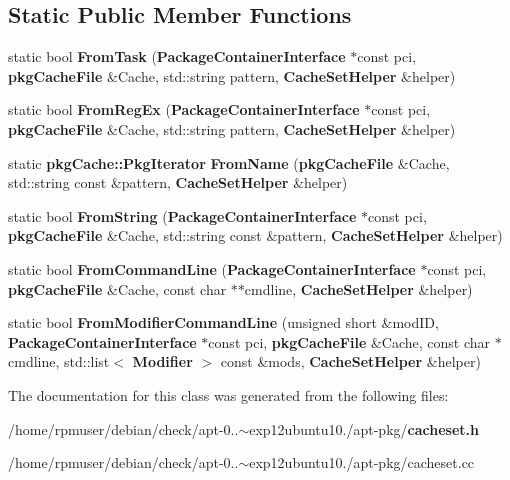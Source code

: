 \subsection*{\-Static \-Public \-Member \-Functions}
\begin{DoxyCompactItemize}
\item 
static bool {\bfseries \-From\-Task} ({\bf \-Package\-Container\-Interface} $\ast$const pci, {\bf pkg\-Cache\-File} \&\-Cache, std\-::string pattern, {\bf \-Cache\-Set\-Helper} \&helper)\label{classAPT_1_1PackageContainerInterface_a16cb5b96236de4a8ab72d1a6aabd1b08}

\item 
static bool {\bfseries \-From\-Reg\-Ex} ({\bf \-Package\-Container\-Interface} $\ast$const pci, {\bf pkg\-Cache\-File} \&\-Cache, std\-::string pattern, {\bf \-Cache\-Set\-Helper} \&helper)\label{classAPT_1_1PackageContainerInterface_aaefa144c45b4268979140612d5259a2b}

\item 
static {\bf pkg\-Cache\-::\-Pkg\-Iterator} {\bfseries \-From\-Name} ({\bf pkg\-Cache\-File} \&\-Cache, std\-::string const \&pattern, {\bf \-Cache\-Set\-Helper} \&helper)\label{classAPT_1_1PackageContainerInterface_a1c485e0fdaa90c1f089ef5d97668df4d}

\item 
static bool {\bfseries \-From\-String} ({\bf \-Package\-Container\-Interface} $\ast$const pci, {\bf pkg\-Cache\-File} \&\-Cache, std\-::string const \&pattern, {\bf \-Cache\-Set\-Helper} \&helper)\label{classAPT_1_1PackageContainerInterface_ae690083263e27b78a034a30855a1dbf9}

\item 
static bool {\bfseries \-From\-Command\-Line} ({\bf \-Package\-Container\-Interface} $\ast$const pci, {\bf pkg\-Cache\-File} \&\-Cache, const char $\ast$$\ast$cmdline, {\bf \-Cache\-Set\-Helper} \&helper)\label{classAPT_1_1PackageContainerInterface_a67672d23a14e49d59153c10bcd15c972}

\item 
static bool {\bfseries \-From\-Modifier\-Command\-Line} (unsigned short \&mod\-I\-D, {\bf \-Package\-Container\-Interface} $\ast$const pci, {\bf pkg\-Cache\-File} \&\-Cache, const char $\ast$cmdline, std\-::list$<$ {\bf \-Modifier} $>$ const \&mods, {\bf \-Cache\-Set\-Helper} \&helper)\label{classAPT_1_1PackageContainerInterface_a50268bdc6ac7b73ef0a253353c9c1fcb}

\end{DoxyCompactItemize}


\-The documentation for this class was generated from the following files\-:\begin{DoxyCompactItemize}
\item 
/home/rpmuser/debian/check/apt-\/0..$\sim$exp12ubuntu10./apt-\/pkg/{\bf cacheset.\-h}\item 
/home/rpmuser/debian/check/apt-\/0..$\sim$exp12ubuntu10./apt-\/pkg/cacheset.\-cc\end{DoxyCompactItemize}
